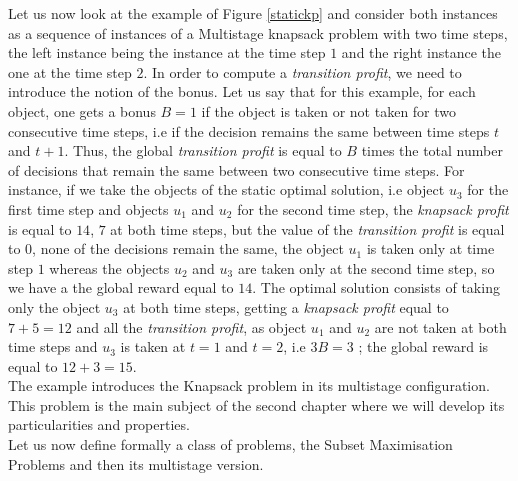 \documentclass[a4paper]{book}
\begin{document}
Let us now look at the example of Figure \ref{statickp} and consider both instances as a sequence of instances of a {\sc Multistage knapsack} problem with two time steps, the left instance being the instance at the time step $1$ and the right instance the one at the time step $2$. In order to compute a \textit{transition profit}, we need to introduce the notion of the bonus. Let us say that for this example, for each object, one gets a bonus $B=1$ if the object is taken or not taken for two consecutive time steps, i.e if the decision remains the same between time steps $t$ and $t+1$. Thus, the global \textit{transition profit} is equal to $B$ times the total number of decisions that remain the same between two consecutive time steps. For instance, if we take the objects of the static optimal solution, i.e object $u_3$ for the first time step and objects $u_1$ and $u_2$ for the second time step, the \textit{knapsack profit} is equal to $14$, $7$ at both time steps, but the value of the \textit{transition profit} is equal to $0$, none of the decisions remain the same, the object $u_1$ is taken only at time step $1$ whereas the objects $u_2$ and $u_3$ are taken only at the second time step, so we have a the global reward equal to $14$. The optimal solution consists of taking only the object $u_3$ at both time steps, getting a \textit{knapsack profit} equal to $7+5=12$ and all the \textit{transition profit}, as object $u_1$ and $u_2$ are not taken at both time steps and $u_3$ is taken at $t=1$ and $t=2$, i.e $3B = 3$ ; the global
reward is equal to $12+3=15$.\\

The example introduces the {\sc Knapsack} problem in its multistage configuration. This problem is the main subject of the second chapter where we will develop its particularities and properties.\\

Let us now define formally a class of problems, the Subset Maximisation Problems and then its multistage version.
\end{document}
